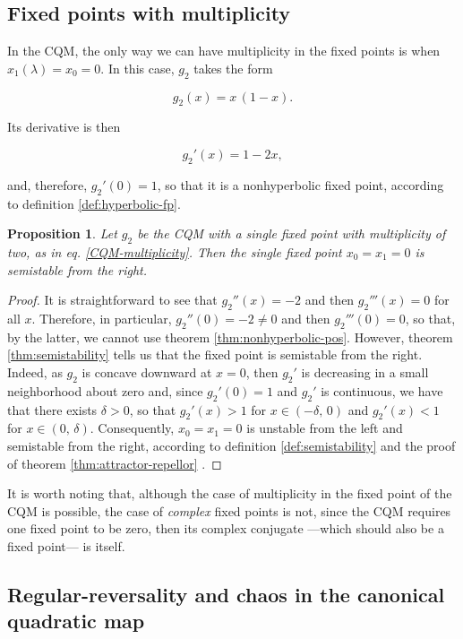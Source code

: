 \documentclass[10pt,twoside,titlepage]{book}
\numberwithin{equation}{chapter}
\numberwithin{figure}{chapter}
\numberwithin{table}{chapter}
\theoremstyle{plain}%
\newtheorem{prop}[thm]{Proposition}
\theoremstyle{definition}
\theoremstyle{remark}
\begin{document}
\subsection{Fixed points with multiplicity}

In the CQM, the only way we can have multiplicity in the fixed points is when $x_1(\lambda)=x_0=0$. In this case, $g_2$ takes the form

\begin{equation}
	\label{CQM-multiplicity}
	g_2(x)=x\,(1-x).
\end{equation}

Its derivative is then

\begin{equation}
	g_2'(x)=1-2x,
\end{equation}

and, therefore, $g_2'(0)=1$, so that it is a nonhyperbolic fixed point, according to definition \ref{def:hyperbolic-fp}.

\begin{prop}\label{prop:quadsemi}
	Let $g_2$ be the CQM with a single fixed point with multiplicity of two, as in eq. \eqref{CQM-multiplicity}. Then the single fixed point $x_0=x_1=0$ is semistable from the right.
\end{prop}
\begin{proof}
	It is straightforward to see that $g_2''(x)=-2$ and then $g_2'''(x)=0$ for all $x$. Therefore, in particular, $g_2''(0)=-2\neq0$ and then $g_2'''(0)=0$, so that, by the latter, we cannot use theorem \ref{thm:nonhyperbolic-pos}. However, theorem \ref{thm:semistability} tells us that the fixed point is semistable from the right. Indeed, as $g_2$ is concave downward at $x=0$, then $g_2'$ is decreasing in a small neighborhood about zero and, since $g_2'(0)=1$ and $g_2'$ is continuous, we have that there exists $\delta>0$, so that $g_2'(x)>1$ for $x\in(-\delta,\,0)$ and $g_2'(x)<1$ for $x\in(0,\,\delta)$. Consequently, $x_0=x_1=0$ is unstable from the left and semistable from the right, according to definition \ref{def:semistability} and the proof of theorem \ref{thm:attractor-repellor} \cite{Elaydi}.
\end{proof}

It is worth noting that, although the case of multiplicity in the fixed point of the CQM is possible, the case of \emph{complex} fixed points is not, since the CQM requires one fixed point to be zero, then its complex conjugate ---which should also be a fixed point--- is itself.

\subsection{Regular-reversality and chaos in the canonical quadratic map}
\end{document}
